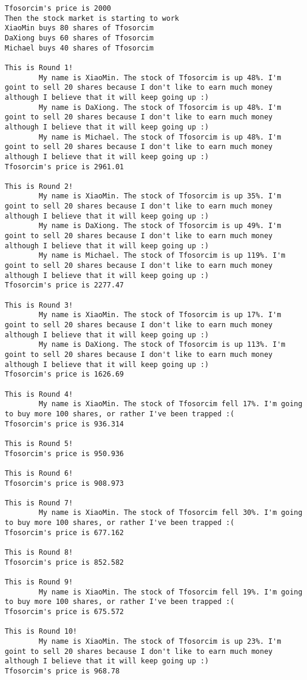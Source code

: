 \documentclass{article}
\begin{document}
\begin{lstlisting}
Tfosorcim's price is 2000
Then the stock market is starting to work
XiaoMin buys 80 shares of Tfosorcim
DaXiong buys 60 shares of Tfosorcim
Michael buys 40 shares of Tfosorcim

This is Round 1!
        My name is XiaoMin. The stock of Tfosorcim is up 48%. I'm goint to sell 20 shares because I don't like to earn much money although I believe that it will keep going up :)
        My name is DaXiong. The stock of Tfosorcim is up 48%. I'm goint to sell 20 shares because I don't like to earn much money although I believe that it will keep going up :)
        My name is Michael. The stock of Tfosorcim is up 48%. I'm goint to sell 20 shares because I don't like to earn much money although I believe that it will keep going up :)
Tfosorcim's price is 2961.01

This is Round 2!
        My name is XiaoMin. The stock of Tfosorcim is up 35%. I'm goint to sell 20 shares because I don't like to earn much money although I believe that it will keep going up :)
        My name is DaXiong. The stock of Tfosorcim is up 49%. I'm goint to sell 20 shares because I don't like to earn much money although I believe that it will keep going up :)
        My name is Michael. The stock of Tfosorcim is up 119%. I'm goint to sell 20 shares because I don't like to earn much money although I believe that it will keep going up :)
Tfosorcim's price is 2277.47

This is Round 3!
        My name is XiaoMin. The stock of Tfosorcim is up 17%. I'm goint to sell 20 shares because I don't like to earn much money although I believe that it will keep going up :)
        My name is DaXiong. The stock of Tfosorcim is up 113%. I'm goint to sell 20 shares because I don't like to earn much money although I believe that it will keep going up :)
Tfosorcim's price is 1626.69

This is Round 4!
        My name is XiaoMin. The stock of Tfosorcim fell 17%. I'm going to buy more 100 shares, or rather I've been trapped :(
Tfosorcim's price is 936.314

This is Round 5!
Tfosorcim's price is 950.936

This is Round 6!
Tfosorcim's price is 908.973

This is Round 7!
        My name is XiaoMin. The stock of Tfosorcim fell 30%. I'm going to buy more 100 shares, or rather I've been trapped :(
Tfosorcim's price is 677.162

This is Round 8!
Tfosorcim's price is 852.582

This is Round 9!
        My name is XiaoMin. The stock of Tfosorcim fell 19%. I'm going to buy more 100 shares, or rather I've been trapped :(
Tfosorcim's price is 675.572

This is Round 10!
        My name is XiaoMin. The stock of Tfosorcim is up 23%. I'm goint to sell 20 shares because I don't like to earn much money although I believe that it will keep going up :)
Tfosorcim's price is 968.78
\end{lstlisting}
\end{document}
